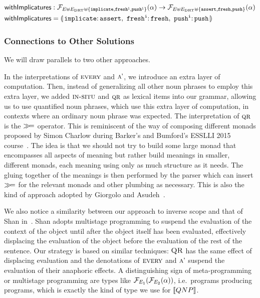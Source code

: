 \begin{align*}
  \withImplicatures &: \FF_{E \uplus E_\DRT \uplus \{\op{implicate},\op{fresh^i},\op{push^i}\}}(\alpha) \to
                       \FF_{E \uplus E_\DRT \uplus \{\op{assert},\op{fresh},\op{push}\}}(\alpha) \\
  \withImplicatures &= \banana{\onto{\op{implicate}}{\op{assert}},\
                               \onto{\op{fresh^i}}{\op{fresh}},\
                               \onto{\op{push^i}}{\op{push}}}
\end{align*}


\subsubsection{Connections to Other Solutions}

We will draw parallels to two other approaches.

In the interpretations of $\textsc{every}$ and $\textsc{a'}$, we introduce an
extra layer of computation. Then, instead of generalizing all other noun
phrases to employ this extra layer, we added $\textsc{in-situ}$ and $\textsc{qr}$
as lexical items into our grammar, allowing us to use quantified noun
phrases, which use this extra layer of computation, in contexts where an
ordinary noun phrase was expected. The interpretation of $\textsc{qr}$ is the
$\mathbin{\gg\!=}$ operator. This is reminiscent of the way of composing different
monads proposed by Simon Charlow during Barker's and Bumford's ESSLLI 2015
course~\cite{barker2015monads}. The idea is that we should not try to build
some large monad that encompasses all aspects of meaning but rather build
meanings in smaller, different monads, each meaning using only as much
structure as it needs. The gluing together of the meanings is then
performed by the parser which can insert $\mathbin{\gg\!=}$ for the relevant monads
and other plumbing as necessary. This is also the kind of approach adopted
by Giorgolo and Asudeh~\cite{giorgolo2015natural}.

We also notice a similarity between our approach to inverse scope and that
of Shan in~\cite{shan2007inverse}. Shan adopts multistage programming to
suspend the evaluation of the context of the object until after the object
itself has been evaluated, effectively displacing the evaluation of the
object before the evaluation of the rest of the sentence. Our strategy is
based on similar techniques: $\textsc{QR}$ has the same effect of displacing
evaluation and the denotations of $\textsc{every}$ and $\textsc{a'}$ suspend the
evaluation of their anaphoric effects. A distinguishing sign of
meta-programming or multistage programming are types like
$\mathcal{F}_{E_1}(\mathcal{F}_{E_2}(\alpha))$, i.e.\ programs producing programs, which is
exactly the kind of type we use for $\llbracket QNP \rrbracket$.


